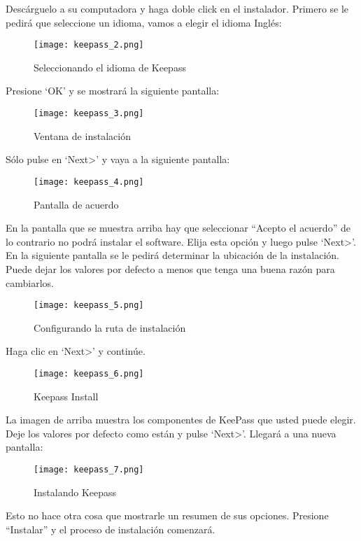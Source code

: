 \documentclass[10pt,a5paper,twoside,,]{book}
\begin{document}
Descárguelo a su computadora y haga doble click en el instalador.
Primero se le pedirá que seleccione un idioma, vamos a elegir el idioma
Inglés:

\begin{figure}[htbp]
\centering
\texttt{[image: keepass\_2.png]}
\caption{Seleccionando el idioma de Keepass}
\end{figure}

Presione `OK' y se mostrará la siguiente pantalla:

\begin{figure}[htbp]
\centering
\texttt{[image: keepass\_3.png]}
\caption{Ventana de instalación}
\end{figure}

Sólo pulse en `Next\textgreater{}' y vaya a la siguiente pantalla:

\begin{figure}[htbp]
\centering
\texttt{[image: keepass\_4.png]}
\caption{Pantalla de acuerdo}
\end{figure}

En la pantalla que se muestra arriba hay que seleccionar ``Acepto el
acuerdo'' de lo contrario no podrá instalar el software. Elija esta
opción y luego pulse `Next\textgreater{}'. En la siguiente pantalla se
le pedirá determinar la ubicación de la instalación. Puede dejar los
valores por defecto a menos que tenga una buena razón para cambiarlos.

\begin{figure}[htbp]
\centering
\texttt{[image: keepass\_5.png]}
\caption{Configurando la ruta de instalación}
\end{figure}

Haga clic en `Next\textgreater{}' y continúe.

\begin{figure}[htbp]
\centering
\texttt{[image: keepass\_6.png]}
\caption{Keepass Install}
\end{figure}

La imagen de arriba muestra los componentes de KeePass que usted puede
elegir. Deje los valores por defecto como están y pulse
`Next\textgreater{}'. Llegará a una nueva pantalla:

\begin{figure}[htbp]
\centering
\texttt{[image: keepass\_7.png]}
\caption{Instalando Keepass}
\end{figure}

Esto no hace otra cosa que mostrarle un resumen de sus opciones.
Presione ``Instalar'' y el proceso de instalación comenzará.
\end{document}
